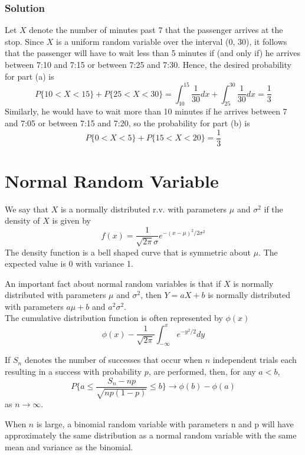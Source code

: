 \subsubsection*{Solution}
Let $X$ denote the number of minutes past 7 that the passenger arrives at the stop.
Since $X$ is a uniform random variable over the interval (0, 30), it follows that the
passenger will have to wait less than 5 minutes if (and only if) he arrives between
7:10 and 7:15 or between 7:25 and 7:30. Hence, the desired probability for part
(a) is \[P\{10 < X < 15\} + P\{25 < X < 30\} = \int^15_10 \frac{1}{30} dx + \int^30_25 \frac{1}{30} dx = \frac{1}{3}\]
Similarly, he would have to wait more than 10 minutes if he arrives between 7
and 7:05 or between 7:15 and 7:20, so the probability for part (b) is 
\[P\{0 < X < 5\} + P\{15 < X < 20\} = \frac{1}{3}\]
\section{Normal Random Variable}
\begin{definition}
    We say that $X$ is a normally distributed r.v. with parameters $\mu$ and $\sigma^2$ if the density of $X$ is given by
    \[f(x) = \frac{1}{\sqrt{2\pi}\sigma}e^{-(x-\mu)^2/2\sigma^2}\]
    The density function is a bell shaped curve that is symmetric about $\mu$. The expected value is 0 with variance 1. 
\end{definition}
An important fact about normal random variables is that if $X$ is normally distributed with parameters $\mu$ and $\sigma^2$, then $Y = aX + b$ is normally distributed with parameters $a\mu + b$ and $a^2\sigma^2$.\\
The cumulative distribution function is often represented by $\phi(x)$
\[\phi(x) - \frac{1}{\sqrt{2\pi}}\int^x_{-\infty} e^{-y^2/2} dy\]
\begin{theorem}
If $S_n$ denotes the number of successes that occur when $n$ independent trials each resulting in a success with probability $p$, are performed, then, for any $a < b$, \[P\{a\leq \frac{S_n - np}{\sqrt{np(1-p)}}\leq b\}\rightarrow \phi(b) - \phi(a)\]
as $n\rightarrow\infty$.
\end{theorem}
When $n$ is large, a binomial random variable with parameters n and p will have approximately the same distribution as a normal random variable with the same mean and variance as the binomial. 
